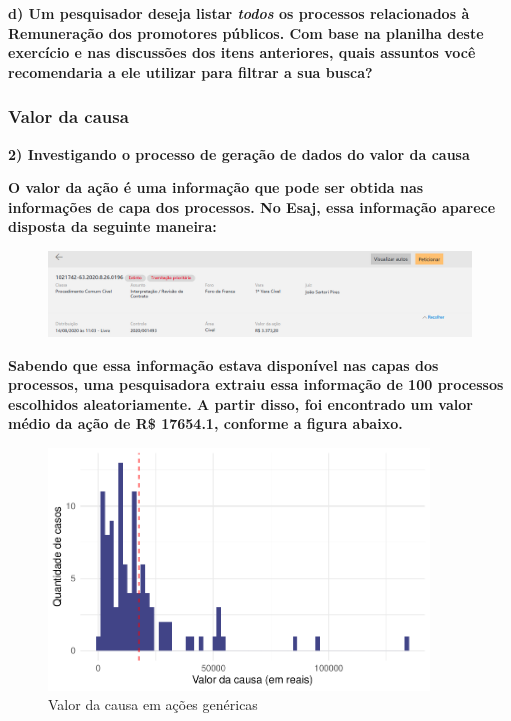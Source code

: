 \documentclass[
  letterpaper,
  DIV=11,
  numbers=noendperiod]{scrartcl}
\begin{document}
\textbf{d) Um pesquisador deseja listar \emph{todos} os processos
relacionados à Remuneração dos promotores públicos. Com base na planilha
deste exercício e nas discussões dos itens anteriores, quais assuntos
você recomendaria a ele utilizar para filtrar a sua busca?}

\newpage{}

\hypertarget{valor-da-causa}{%
\subsubsection{Valor da causa}\label{valor-da-causa}}

\textbf{2) Investigando o processo de geração de dados do valor da
causa}

\textbf{O valor da ação é uma informação que pode ser obtida nas
informações de capa dos processos. No Esaj, essa informação aparece
disposta da seguinte maneira:}

\begin{figure}

{\centering \includegraphics[width=1\textwidth,height=\textheight]{img/valor-da-causa.png}

}

\end{figure}

\textbf{Sabendo que essa informação estava disponível nas capas dos
processos, uma pesquisadora extraiu essa informação de 100 processos
escolhidos aleatoriamente. A partir disso, foi encontrado um valor médio
da ação de R\$ 17654.1, conforme a figura abaixo.}

\begin{figure}

{\centering \includegraphics[width=0.9\textwidth,height=\textheight]{e_pgd_files/figure-pdf/fig-consumo-1.pdf}

}

\caption{\label{fig-consumo}Valor da causa em ações genéricas}

\end{figure}
\end{document}
